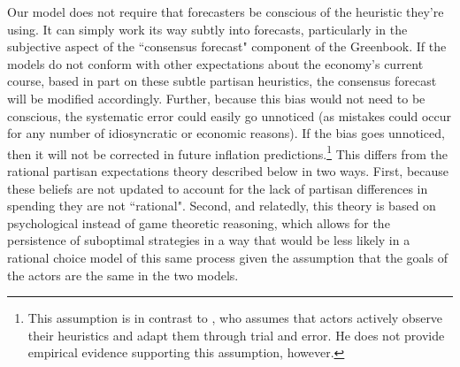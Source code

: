 \documentclass[a4paper]{article}\usepackage{graphicx, color}
\begin{document}
Our model does not require that forecasters be conscious of the heuristic they're using. It can simply work its way subtly into forecasts, particularly in the subjective aspect of the ``consensus forecast" component of the Greenbook. If the models do not conform with other expectations about the economy's current course, based in part on these subtle partisan heuristics, the consensus forecast will be modified accordingly. Further, because this bias would not need to be conscious, the systematic error could easily go unnoticed (as mistakes could occur for any number of idiosyncratic or economic reasons). If the bias goes unnoticed, then it will not be corrected in future inflation predictions.\footnote{This assumption is in contrast to \cite{Grauwe2011}, who assumes that actors actively observe their heuristics and adapt them through trial and error. He does not provide empirical evidence supporting this assumption, however.} This differs from the rational partisan expectations theory described below in two ways. First, because these beliefs are not updated to account for the lack of partisan differences in spending they are not ``rational". Second, and relatedly, this theory is based on psychological instead of game theoretic reasoning, which allows for the persistence of suboptimal strategies in a way that would be less likely in a rational choice model of this same process given the assumption that the goals of the actors are the same in the two models.





\end{document}
